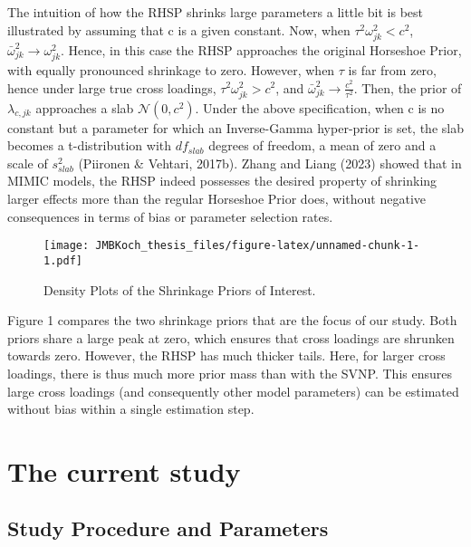 \documentclass[
  man, donotrepeattitle,floatsintext]{apa6}
\begin{document}
The intuition of how the RHSP shrinks large parameters a little bit is
best illustrated by assuming that c is a given constant. Now, when
\(\tau^2 \omega^2_{jk} < c^2\), \(\bar{\omega}^2_{jk} \to \omega^2_{jk}\).
Hence, in this case the RHSP approaches the original Horseshoe Prior,
with equally pronounced shrinkage to zero. However, when \(\tau\) is far
from zero, hence under large true cross loadings,
\(\tau^2 \omega^2_{jk} > c^2\), and
\(\bar{\omega}^2_{jk} \to \frac{c^2}{\tau^2}\). Then, the prior of
\(\lambda_{c,jk}\) approaches a slab \(\mathcal{N}(0, c^2)\). Under the
above specification, when c is no constant but a parameter for which an
Inverse-Gamma hyper-prior is set, the slab becomes a t-distribution with
\(df_{slab}\) degrees of freedom, a mean of zero and a scale of
\(s_{slab}^2\) (Piironen \& Vehtari, 2017b). Zhang and Liang (2023) showed that
in MIMIC models, the RHSP indeed possesses the desired property of
shrinking larger effects more than the regular Horseshoe Prior does,
without negative consequences in terms of bias or parameter selection
rates.

\begin{figure}
\centering
\texttt{[image: JMBKoch\_thesis\_files/figure-latex/unnamed-chunk-1-1.pdf]}
\caption{\label{fig:unnamed-chunk-1}Density Plots of the Shrinkage Priors of Interest.}
\end{figure}

Figure 1 compares the two shrinkage priors that are the focus of our
study. Both priors share a large peak at zero, which ensures that cross
loadings are shrunken towards zero. However, the RHSP has much thicker
tails. Here, for larger cross loadings, there is thus much more prior
mass than with the SVNP. This ensures large cross loadings (and
consequently other model parameters) can be estimated without bias
within a single estimation step.

\hypertarget{the-current-study}{%
\section{The current study}\label{the-current-study}}

\hypertarget{study-procedure-and-parameters}{%
\subsection{Study Procedure and Parameters}\label{study-procedure-and-parameters}}
\end{document}
